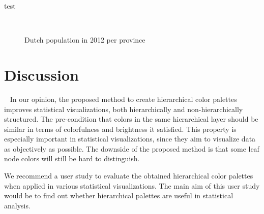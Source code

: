 \documentclass[journal]{vgtc}                %
\begin{document}
test

\begin{figure}[tb]
  \centering
  \mbox{
  }
  \caption{Dutch population in 2012 per province}\label{fig:barSvy}

\end{figure}


\section{Discussion}~\label{secdisc}
In our opinion, the proposed method to create hierarchical color palettes improves statistical visualizations, both hierarchically and non-hierarchically structured. The pre-condition that colors in the same hierarchical layer should be similar in terms of colorfulness and brightness it satisfied. This property is especially important in statistical visualizations, since they aim to visualize data as objectively as possible. The downside of the proposed method is that some leaf node colors will still be hard to distinguish.

We recommend a user study to evaluate the obtained hierarchical color palettes when applied in various statistical visualizations. The main aim of this user study would be to find out whether hierarchical palettes are useful in statistical analysis.





\end{document}
